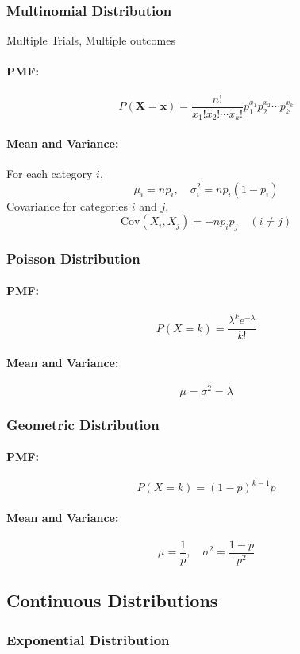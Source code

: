 \documentclass[8pt, a4paper, landscape, includeheadfoot]{extarticle}
\begin{document}
\begin{multicols*}{4}
	\subsubsection{Multinomial Distribution}{}
	Multiple Trials, Multiple outcomes
	\paragraph{PMF:}
	$$
		P(\mathbf{X} = \mathbf{x}) = \frac{n!}{x_1! x_2! \cdots x_k!} p_1^{x_1} p_2^{x_2} \cdots p_k^{x_k}
	$$
	\paragraph{Mean and Variance:}
	For each category $i$,
	$$
		\mu_i = np_i, \quad \sigma^2_i = np_i(1 - p_i)
	$$
	Covariance for categories $i$ and $j$,
	$$
		\mathrm{Cov}(X_i, X_j) = -np_i p_j \quad (i \neq j)
	$$

	\subsubsection{Poisson Distribution}{}
	\paragraph{PMF:}
	$$
		P(X = k) = \frac{\lambda^k e^{-\lambda}}{k!}
	$$
	\paragraph{Mean and Variance:}
	$$
		\mu = \sigma^2 = \lambda
	$$

	\subsubsection{Geometric Distribution}{}
	\paragraph{PMF:}
	$$
		P(X = k) = (1-p)^{k-1} p
	$$
	\paragraph{Mean and Variance:}
	$$
		\mu = \frac{1}{p}, \quad \sigma^2 = \frac{1 - p}{p^2}
	$$

	\subsection{Continuous Distributions}

	\subsubsection{Exponential Distribution}{}

\end{multicols*}
\end{document}
